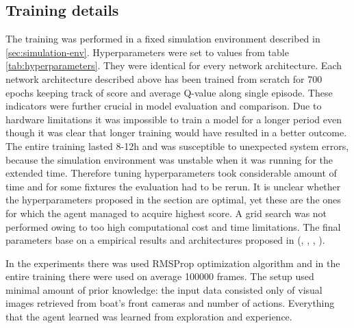 \subsection{Training details}
\label{sub:training-details}

The training was performed in a fixed simulation environment described in \ref{sec:simulation-env}. Hyperparameters were set to values from
table \ref{tab:hyperparameters}. They were identical for every network architecture. Each network architecture described above has been
trained from scratch for 700 epochs keeping track of score and average Q-value along single episode. These indicators were further crucial
in model evaluation and comparison. Due to hardware limitations it was impossible to train a model for a longer period even though it was
clear that longer training would have resulted in a better outcome. The entire training lasted 8-12h and was susceptible to unexpected
system errors, because the simulation environment was unstable when it was running for the extended time. Therefore tuning hyperparameters
took considerable amount of time and for some fixtures the evaluation had to be rerun. It is unclear whether the hyperparameters proposed
in the section are optimal, yet these are the ones for which the agent managed to acquire highest score. A grid search was not performed
owing to too high computational cost and time limitations. The final parameters base on a empirical results and architectures proposed in
(\cite{DQNAtari}, \cite{2020DuckieTown}, \cite{DBLP:journals/corr/HasseltGS15}, \cite{DBLP:journals/corr/WangFL15}).

In the experiments there was used RMSProp optimization algorithm and in the entire training there were used on average 100000 frames. The setup used minimal amount of prior knowledge: the input data consisted only of visual images retrieved from boat's front cameras and number of actions. Everything that the agent learned was learned from exploration and experience.